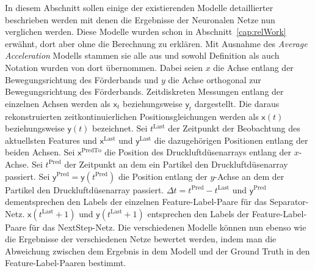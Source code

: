 
In diesem Abschnitt sollen einige der existierenden Modelle detaillierter beschrieben werden mit denen die Ergebnisse der Neuronalen Netze nun verglichen werden.
Diese Modelle wurden schon in Abschnitt~\ref{cap:relWork} erwähnt, dort aber ohne die Berechnung zu erklären.
Mit Ausnahme des \textit{Average Acceleration} Modells stammen sie alle aus \cite{Pfaff2018} und sowohl Definition als auch Notation wurden von dort übernommen.
Dabei seien \(x\) die Achse entlang der Bewegungsrichtung des Förderbands und \(y\) die Achse orthogonal zur Bewegungsrichtung des Förderbands.
Zeitdiskreten Messungen entlang der einzelnen Achsen werden als \(\mathsf{x}_t\) beziehungsweise \(\mathsf{y}_t\) dargestellt.
Die daraus rekonstruierten zeitkontinuierlichen Positionsgleichungen werden als \(\mathsf{x}(t)\) beziehungsweise \(\mathsf{y}(t)\) bezeichnet.
Sei \(t^{\text{Last}}\) der Zeitpunkt der Beobachtung des aktuellsten Features und \(\mathsf{x}^{\text{Last}}\) und \(\mathsf{y}^{\text{Last}}\) die dazugehörigen Positionen entlang der beiden Achsen.
Sei \(\mathsf{x}^{\text{PredTo}}\) die Position des Druckluftdüsenarrays entlang der \(x\)-Achse.
Sei \(t^{\text{Pred}}\) der Zeitpunkt an dem ein Partikel den Druckluftdüsenarray passiert.
Sei \(\mathsf{y}^{\text{Pred}} = \mathsf{y}(t^{\text{Pred}})\) die Position entlang der \(y\)-Achse an dem der Partikel den Druckluftdüsenarray passiert.
\(\Delta t = t^{\text{Pred}} - t^{\text{Last}} \) und \(\mathsf{y}^{\text{Pred}}\) dementsprechen den Labels der einzelnen Feature-Label-Paare für das Separator-Netz.
\(\mathsf{x}(t^{\text{Last}} + 1)\) und \(\mathsf{y}(t^{\text{Last}} + 1)\) entsprechen den Labels der Feature-Label-Paare für das NextStep-Netz.
Die verschiedenen Modelle können nun ebenso wie die Ergebnisse der verschiedenen Netze bewertet werden, 
indem man die Abweichung zwischen dem Ergebnis in dem Modell und der Ground Truth in den Feature-Label-Paaren bestimmt.


